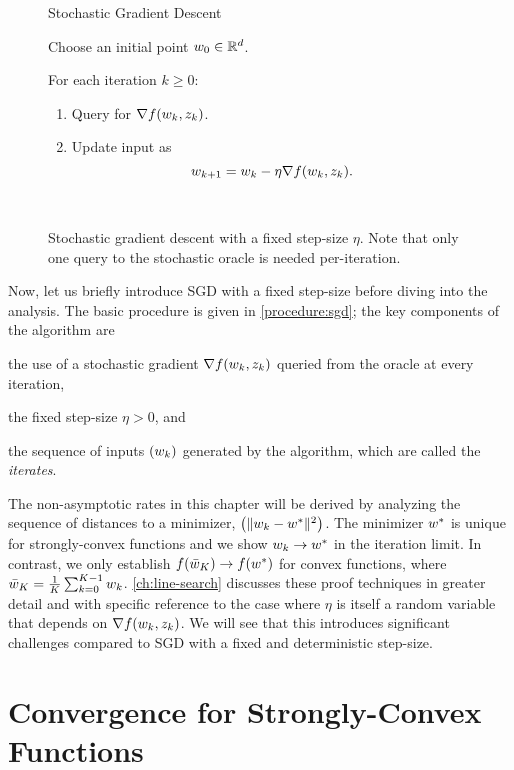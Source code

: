\begin{figure}[t]
\begin{procedure}{Stochastic Gradient Descent}
\item Choose an initial point \( w_0 \in \mathbb{R}^d \).
\item For each iteration \( k \geq 0 \):
    \begin{enumerate}
        \item Query \oracle{} for \( \nabla f(w_k, z_{k}) \).
        \item Update input as\vspace{-1ex}%
            \[ w_{k+1} = w_k - \eta \nabla f(w_k, z_{k}). \]
    \end{enumerate}
\end{procedure}
\caption{Stochastic gradient descent with a fixed step-size \( \eta \). Note that only one query to the stochastic oracle is needed per-iteration.}~\label{procedure:sgd}
\end{figure}

Now, let us briefly introduce \ac{SGD} with a fixed step-size before diving into the analysis.
The basic procedure is given in \autoref{procedure:sgd}; the key components of the algorithm are %
\begin{inparaenum}[(i)] 
    \item the use of a stochastic gradient \( \nabla f(w_k, z_{k}) \) queried from the oracle at every iteration,
    \item the fixed step-size \( \eta > 0 \), and
    \item the sequence of inputs \( \left(w_k\right) \) generated by the algorithm, which are called the \emph{iterates}. 
\end{inparaenum}
The non-asymptotic rates in this chapter will be derived by analyzing the sequence of distances to a minimizer, \( \left(\|w_k - w^*\|^2\right) \). 
The minimizer \( w^* \) is unique for strongly-convex functions and we show \( w_k \rightarrow w^* \) in the iteration limit. 
In contrast, we only establish \( f(\bar {w}_K) \rightarrow f(w^*) \) for convex functions, where \( \bar {w}_K  = \frac{1}{K}\sum_{k=0}^{K-1} w_k \).
\autoref{ch:line-search} discusses these proof techniques in greater detail and with specific reference to the case where \( \eta \) is itself a random variable that depends on \( \nabla f(w_k, z_{k}) \).
We will see that this introduces significant challenges compared to \ac{SGD} with a fixed and deterministic step-size.\\

\section{Convergence for Strongly-Convex Functions}~\label{sec:sgd-sc}

